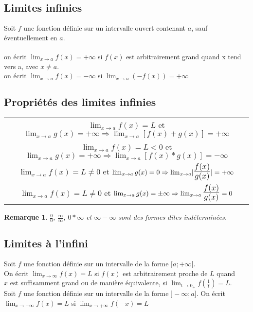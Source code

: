 \documentclass[12pt, a4paper]{book}
\newtheorem*{remarque}{Remarque}
\def\mathLarge#1{\mbox{\LARGE $#1$}}
\begin{document}
\subsection{Limites infinies}
Soit $f$ une fonction définie sur un intervalle ouvert contenant $a$, sauf éventuellement en $a$.\\
\\
on écrit $\lim_{x \to a}f(x) = + \infty$ si $f(x)$ est arbitrairement grand quand x tend vers a, avec $x \not = a$.\\
on écrit $\lim_{x \to a}f(x) = - \infty$ si $\lim_{x \to a}(-f(x)) = + \infty$
\subsection{Propriétés des limites infinies}
\begin{center}
    \begin{tabular}{ |c|}
        \hline
        $\lim_{x \to a} f(x) = L$ et $\lim_{x \to a} g(x) = + \infty \Rightarrow \lim_{x \to a} [f(x)+g(x)] = + \infty $\\
        $\lim_{x \to a} f(x) = L < 0$ et $\lim_{x \to a} g(x) = + \infty \Rightarrow \lim_{x \to a} [f(x)*g(x)] = - \infty $\\
        $\lim_{x \to a} f(x) = L \not = 0$ et $\lim_{x \to a} g(x) = 0 \Rightarrow \lim_{x \to a} \lvert \mathLarge{\frac{f(x)}{g(x)}} \rvert = + \infty $\\
        $\lim_{x \to a} f(x) = L \not = 0$ et $\lim_{x \to a} g(x) = \pm \infty \Rightarrow \lim_{x \to a} \mathLarge{\frac{f(x)}{g(x)}}  = 0 $\\
        \hline
    \end{tabular}
\end{center}
\begin{remarque}
    $\frac{0}{0}$, $\frac{\infty}{\infty}$, $0*\infty$ et $\infty-\infty$ sont des formes dites indéterminées.
\end{remarque}
\subsection{Limites à l'infini}
Soit $f$ une fonction définie sur un intervalle de la forme $[a;+\infty[$.\\
On écrit $\lim_{x \to \infty} f(x) = L$ si $f(x)$ est arbitrairement proche de $L$ quand\\
$x$ est suffisamment grand ou de manière équivalente, si $\lim_{t \to 0_+} f(\frac{1}{t}) = L$.\\
Soit $f$ une fonction définie sur un intervalle de la forme $]- \infty; a]$. On écrit $\lim_{x \to -\infty} f(x) = L$ si $\lim_{x \to +\infty} f(-x) = L$
\newpage
\end{document}

